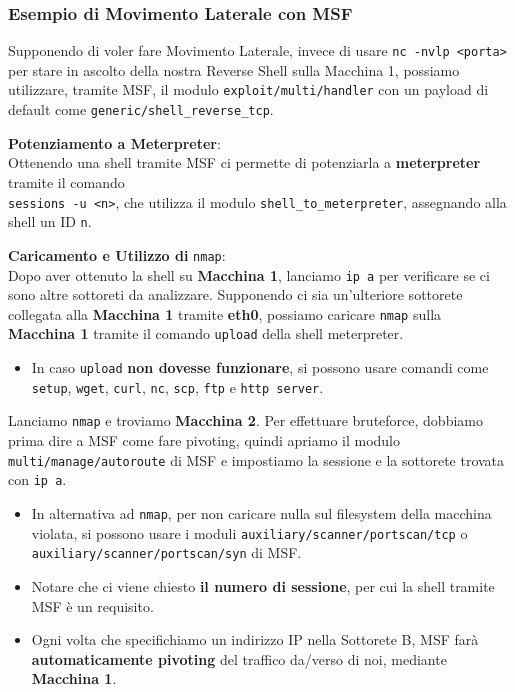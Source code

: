 \documentclass{article}
\begin{document}
\subsubsection{Esempio di Movimento Laterale con MSF}

Supponendo di voler fare Movimento Laterale, invece di usare \verb|nc -nvlp <porta>| per stare in ascolto della nostra Reverse Shell sulla Macchina 1, possiamo utilizzare, tramite MSF, il modulo \verb|exploit/multi/handler| con un payload di default come \verb|generic/shell_reverse_tcp|.

\textbf{Potenziamento a Meterpreter}:\\
Ottenendo una shell tramite MSF ci permette di potenziarla a \textbf{meterpreter} tramite il comando\\ \verb|sessions -u <n>|, che utilizza il modulo \verb|shell_to_meterpreter|, assegnando alla shell un ID \verb|n|.

\textbf{Caricamento e Utilizzo di} \verb|nmap|:\\
Dopo aver ottenuto la shell su \textbf{Macchina 1}, lanciamo \verb|ip a| per verificare se ci sono altre sottoreti da analizzare. Supponendo ci sia un'ulteriore sottorete collegata alla \textbf{Macchina 1} tramite \textbf{eth0}, possiamo caricare \verb|nmap| sulla \textbf{Macchina 1} tramite il comando \verb|upload| della shell meterpreter.
\begin{itemize}
	\item In caso \verb|upload| \textbf{non dovesse funzionare}, si possono usare comandi come \verb|setup|, \verb|wget|, \verb|curl|, \verb|nc|, \verb|scp|, \verb|ftp| e \verb|http server|.
\end{itemize}

Lanciamo \verb|nmap| e troviamo \textbf{Macchina 2}. Per effettuare bruteforce, dobbiamo prima dire a MSF come fare pivoting, quindi apriamo il modulo \verb|multi/manage/autoroute| di MSF e impostiamo la sessione e la sottorete trovata con \verb|ip a|.
\begin{itemize}
	\item In alternativa ad \verb|nmap|, per non caricare nulla sul filesystem della macchina violata, si possono usare i moduli \verb|auxiliary/scanner/portscan/tcp| o \verb|auxiliary/scanner/portscan/syn| di MSF.
	
	\item Notare che ci viene chiesto \textbf{il numero di sessione}, per cui la shell tramite MSF è un requisito.
	
	\item Ogni volta che specifichiamo un indirizzo IP nella Sottorete B, MSF farà \textbf{automaticamente pivoting} del traffico da/verso di noi, mediante \textbf{Macchina 1}.
\end{itemize}
\end{document}
